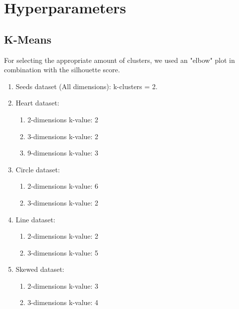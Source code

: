 \chapter{Hyperparameters}
\section{K-Means}
For selecting the appropriate amount of clusters, we used an "elbow" plot in combination with the silhouette score.
\begin{enumerate}
  \item Seeds dataset (All dimensions): k-clusters = 2.
      \item Heart dataset:
      \begin{enumerate}
          \item 2-dimensions k-value: 2
          \item 3-dimensions k-value: 2
          \item 9-dimensions k-value: 3
      \end{enumerate}
      \item Circle dataset:
      \begin{enumerate}
          \item 2-dimensions k-value: 6
          \item 3-dimensions k-value: 2
      \end{enumerate}
      \item Line dataset:
      \begin{enumerate}
          \item 2-dimensions k-value: 2
          \item 3-dimensions k-value: 5
      \end{enumerate}
      \item Skewed dataset:
      \begin{enumerate}
          \item 2-dimensions k-value: 3
          \item 3-dimensions k-value: 4
      \end{enumerate}
  \end{enumerate}

\newpage
